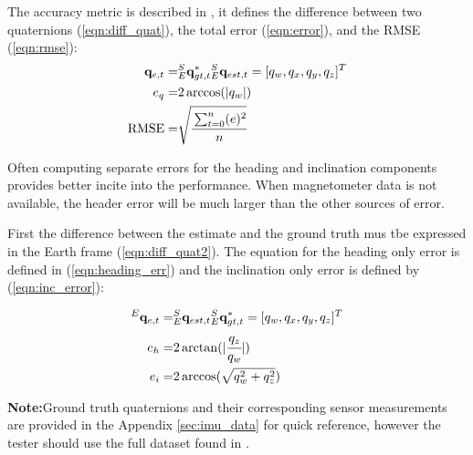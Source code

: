 \documentclass[12pt, titlepage]{article}
\begin{document}
The accuracy metric is described in \cite{broad}, it defines the difference between two quaternions
(\ref{eqn:diff_quat}), the total error (\ref{eqn:error}), and the RMSE (\ref{eqn:rmse}):
\begin{align}
    \mathbf{q}_{e, t} =& {}^S_E\mathbf{q}^{*}_{gt, t}  {}^S_E\mathbf{q}_{est, t} = [q_w, q_x, q_y, q_z]^T \label{eqn:diff_quat} \\
    e_q =& 2 \arccos(|q_w|)  \label{eqn:error}\\
    \text{RMSE} =& \sqrt{\cfrac{\sum_{t=0}^n(e)^2}{n}}  \label{eqn:rmse}
\end{align}

Often computing separate errors for the heading and inclination components provides better incite into the performance. When magnetometer data is not available, the header error will be much larger than the other sources of error.

First the difference between the estimate and the ground truth mus tbe expressed in the Earth frame (\ref{eqn:diff_quat2}). The equation for the heading only error is defined in (\ref{eqn:heading_err}) and the inclination only error is defined by (\ref{eqn:inc_error}):

\begin{align}
    {}^E \mathbf{q}_{e,t} =& {}^S_E\mathbf{q}_{est, t} {}^S_E\mathbf{q}^{*}_{gt, t} = [q_w, q_x, q_y, q_z]^T \label{eqn:diff_quat2} \\
    e_{h} =& 2 \arctan(|\cfrac{q_z}{q_w}|) \label{eqn:heading_err} \\
    e_{i} =&  2 \arccos(\sqrt{q_w^2 + q_z^2}) \label{eqn:inc_error}
\end{align}

\textbf{Note:}Ground truth quaternions and their corresponding sensor measurements are provided in the Appendix \ref{sec:imu_data} for quick reference, however the tester should use the full dataset found in \citep{broad_code}.
\end{document}
